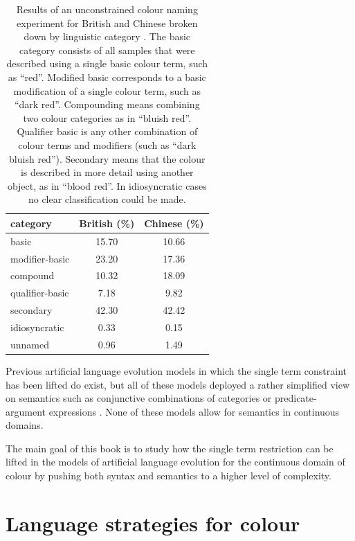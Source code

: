 \begin{table}[htbp]
  \centering
  \begin{tabular}{lcc}
    \hline
    category & British (\%) & Chinese (\%) \\
    \hline
    basic & 15.70 & 10.66 \\
    modifier-basic & 23.20 & 17.36 \\
    compound & 10.32 & 18.09 \\
    qualifier-basic & 7.18 & 9.82 \\
    secondary & 42.30 & 42.42 \\
    idiosyncratic & 0.33 & 0.15 \\
    unnamed & 0.96 & 1.49 \\
    \hline
  \end{tabular}
  \label{t:unconstrained-naming}
  \caption[Results of an unconstrained colour naming experiment for 
  British and Chinese broken down by linguistic category]{Results of an unconstrained colour naming experiment for British and Chinese broken down by linguistic category \citep[after][]{lin01unconstrained}. The basic category consists of all samples that were described using a single basic colour term, such as ``red''. Modified basic corresponds to a basic modification of a single colour term, such as ``dark red''. Compounding means combining two colour categories as in ``bluish red''. Qualifier basic is any other combination of colour terms and modifiers (such as ``dark bluish red''). Secondary means that the colour is described in more detail using another object, as in ``blood red''. In idiosyncratic cases no clear classification could be made.}
\end{table}

Previous artificial language evolution models in which the single term
constraint has been lifted do exist, but all of these models deployed
a rather simplified view on semantics such as conjunctive combinations of
categories \citep{wellens08flexible} or predicate-argument expressions
\citep{batali02negotiation, smith03iterated, debeule08emergence}.
None of these models allow for semantics in continuous domains.

The main goal of this book is to study how the single term
restriction can be lifted in the models of artificial language
evolution for the continuous domain of colour by pushing both syntax
and semantics to a higher level of complexity.

\section{Language strategies for colour}
\label{s:strats-for-colour}


